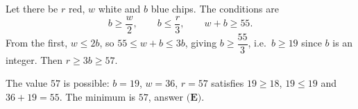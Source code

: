 Let there be $r$ red, $w$ white and $b$ blue chips. The conditions are
\[b\ge\dfrac {w}{2},\qquad b\le\dfrac {r}{3},\qquad w+b\ge55.\]
From the first, $w\le2b$, so $55\le w+b\le3b$, giving $b\ge\dfrac{55}{3}$, i.e.\ $b\ge19$ since $b$ is an integer. Then $r\ge3b\ge57$.

The value $57$ is possible: $b=19$, $w=36$, $r=57$ satisfies $19\ge18$, $19\le19$ and $36+19=55$. The minimum is $\boxed{57}$, answer $\textbf{(E)}$.
